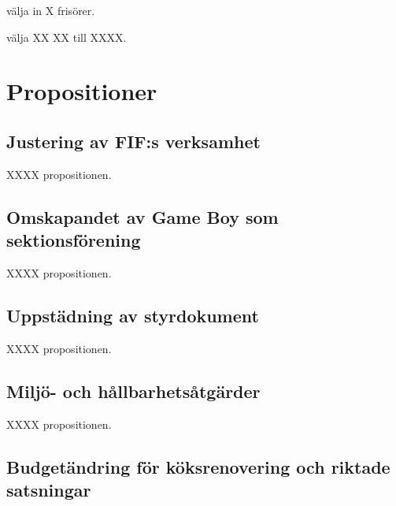 \documentclass[hidelinks]{sektionsmote}
\begin{document}
\begin{beslut}
  \item välja in X frisörer.
\end{beslut}
\begin{beslut}
  \item välja XX XX till XXXX.
\end{beslut}



\section{Propositioner}
\subsection{Justering av FIF:s verksamhet}

\begin{beslut}
  \item XXXX propositionen.
\end{beslut}


\subsection{Omskapandet av Game Boy som sektionsförening}

\begin{beslut}
  \item XXXX propositionen.
\end{beslut}


\subsection{Uppstädning av styrdokument}

\begin{beslut}
  \item XXXX propositionen.
\end{beslut}


\subsection{Miljö- och hållbarhetsåtgärder}

\begin{beslut}
  \item XXXX propositionen.
\end{beslut}


\subsection{Budgetändring för köksrenovering och riktade satsningar}
\end{document}
